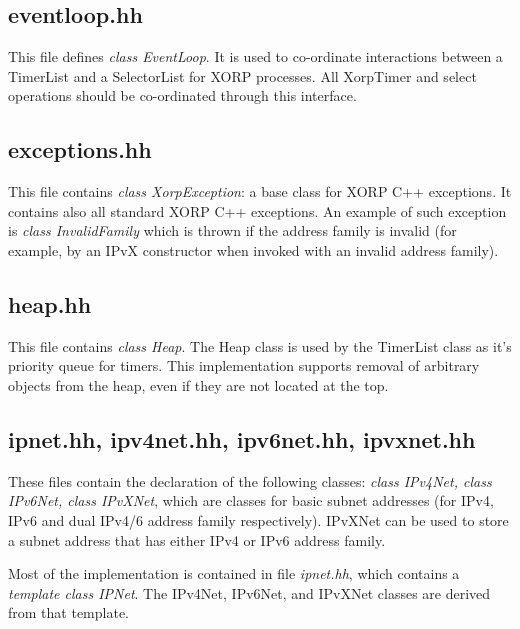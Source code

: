 \documentclass[11pt]{article}
\begin{document}
\subsection{eventloop.hh}

This file defines \emph{class EventLoop}.
It is used to co-ordinate interactions between a TimerList and a
SelectorList for XORP processes.  All XorpTimer and select operations
should be co-ordinated through this interface.

\subsection{exceptions.hh}

This file contains \emph{class XorpException}: a base class for XORP C++
exceptions. It contains also all standard XORP C++ exceptions.
An example of such exception is \emph{class InvalidFamily} which is
thrown if the address family is invalid (for example, by an IPvX
constructor when invoked with an invalid address family).

\subsection{heap.hh}

This file contains \emph{class Heap}.  The Heap class is used by the
TimerList class as it's priority queue for timers. This implementation
supports removal of arbitrary objects from the heap, even if they are
not located at the top.

\subsection{ipnet.hh, ipv4net.hh, ipv6net.hh, ipvxnet.hh}

These files contain the declaration of the following classes:
\emph{class IPv4Net, class IPv6Net, class IPvXNet}, which are
classes for basic subnet addresses (for IPv4, IPv6 and dual IPv4/6
address family respectively). IPvXNet can be used to store a subnet
address that has either IPv4 or IPv6 address family.

Most of the implementation is contained in file \emph{ipnet.hh}, which
contains a \emph{template class IPNet}. The IPv4Net, IPv6Net, and
IPvXNet classes are derived from that template.

\end{document}
